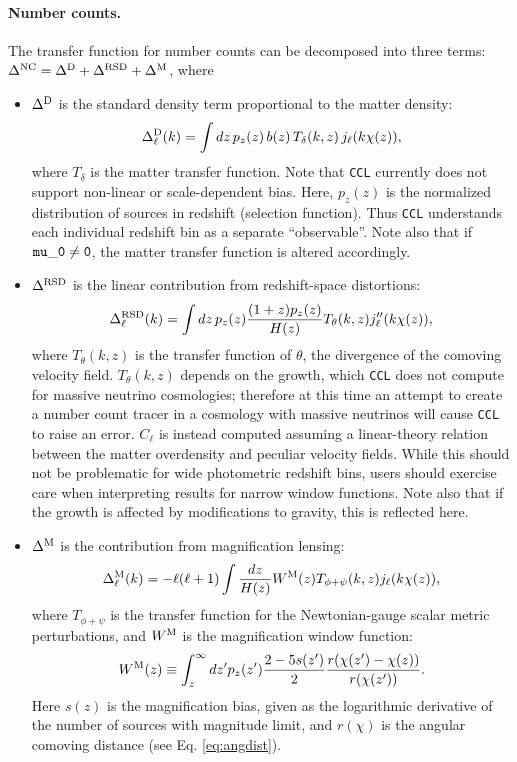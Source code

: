 \documentclass[\docopts]{\docclass}
\newcommand{\ccl}{{\tt CCL}\xspace}
\begin{document}
\paragraph{\bf Number counts.} The transfer function for number counts can be decomposed into three terms: $\Delta^{\rm NC}=\Delta^{\rm D}+\Delta^{\rm RSD}+\Delta^{\rm M}$, where
\begin{itemize}
  \item $\Delta^{\rm D}$ is the standard density term proportional to the matter density:
        \begin{equation}
          \Delta^{\rm D}_\ell(k)=\int dz\,p_z(z)\,b(z)\,T_\delta(k,z)\,j_\ell(k\chi(z)),
        \end{equation}
        where $T_\delta$ is the matter transfer function. Note that \ccl currently does not support non-linear or scale-dependent bias. Here, $p_z(z)$ is the normalized distribution of sources in redshift (selection function). Thus \ccl understands each individual redshift bin as a separate ``observable''. Note also that if ${\tt mu\_0 \ne 0}$, the matter transfer function is altered accordingly.
  \item $\Delta^{\rm RSD}$ is the linear contribution from redshift-space distortions:
        \begin{equation}
          \Delta^{\rm RSD}_\ell(k)=\int dz\,p_z(z)\frac{(1+z) p_z(z)}{H(z)}T_\theta(k,z) j_\ell''(k\chi(z)),
        \end{equation}
        where $T_\theta(k,z)$ is the transfer function of $\theta$, the divergence of the comoving velocity field. $T_\theta(k,z)$ depends on the growth, which \ccl does not compute for massive neutrino cosmologies; therefore at this time an attempt to create a number count tracer in a cosmology with massive neutrinos will cause \ccl to raise an error. $C_\ell$ is instead computed assuming a linear-theory relation between the matter overdensity and peculiar velocity fields. While this should not be problematic for wide photometric redshift bins, users should exercise care when interpreting results for narrow window functions. Note also that if the growth is affected by modifications to gravity, this is reflected here.
  \item $\Delta^{\rm M}$ is the contribution from magnification lensing:
        \begin{equation}
          \Delta_\ell^{\rm M}(k)=-\ell(\ell+1)\int \frac{dz}{H(z)} W^{\rm M}(z) T_{\phi+\psi}(k,z) j_\ell(k\chi(z)),
          \label{eq:deltaM}
        \end{equation}
        where $T_{\phi+\psi}$ is the transfer function for the Newtonian-gauge scalar metric perturbations, and $W^{\rm M}$ is the magnification window function:
        \begin{equation}
           W^{\rm M}(z)\equiv\int_z^\infty dz' p_z(z')\frac{2-5s(z')}{2}\frac{r(\chi(z')-\chi(z))}{r(\chi(z'))}.
        \end{equation}
        Here $s(z)$ is the magnification bias, given as the logarithmic derivative of the number of sources with magnitude limit, and $r(\chi)$ is the angular comoving distance (see Eq. \ref{eq:angdist}).
        

\end{itemize}
\end{document}
